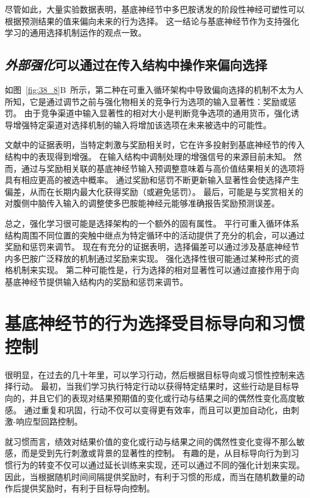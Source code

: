 尽管如此，大量实验数据表明，基底神经节中多巴胺诱发的阶段性神经可塑性可以根据预测结果的值来偏向未来的行为选择。
这一结论与基底神经节作为支持强化学习的通用选择机制运作的观点一致。



\subsection{\textit{外部强化}可以通过在传入结构中操作来偏向选择}

如图~\ref{fig:38_8}B~所示，第二种在可重入循环架构中导致偏向选择的机制不太为人所知，它是通过调节之前与强化物相关的竞争行为选项的输入显著性：奖励或惩罚。
由于竞争渠道中输入显著性的相对大小是判断竞争选项的通用货币，强化诱导增强特定渠道对选择机制的输入将增加该选项在未来被选中的可能性。


文献中的证据表明，当特定刺激与奖励相关时，它在许多投射到基底神经节的传入结构中的表现得到增强。
在输入结构中调制处理的增强信号的来源目前未知。
然而，通过与奖励相关联的基底神经节输入预调整意味着与高价值结果相关的选项将具有相应更高的被选中概率。
通过奖励和惩罚不断更新输入显著性会使选择产生偏差，从而在长期内最大化获得奖励（或避免惩罚）。
最后，可能是与奖赏相关的对腹侧中脑传入输入的调整使多巴胺能神经元能够准确报告奖励预测误差。


总之，强化学习很可能是选择架构的一个额外的固有属性。
平行可重入循环体系结构周围不同位置的突触中继点为特定循环中的活动提供了充分的机会，可以通过奖励和惩罚来调节。
现在有充分的证据表明，选择偏差可以通过涉及基底神经节内多巴胺广泛释放的机制通过奖励来实现。
强化选择性很可能通过某种形式的资格机制来实现。
第二种可能性是，行为选择的相对显著性可以通过直接作用于向基底神经节提供输入结构内的奖励和惩罚来调节。



\section{基底神经节的行为选择受目标导向和习惯控制}

很明显，在过去的几十年里，可以学习行动，然后根据目标导向或习惯性控制来选择行动。
最初，当我们学习执行特定行动以获得特定结果时，这些行动是目标导向的，并且它们的表现对结果预期值的变化或行动与结果之间的偶然性变化高度敏感。
通过重复和巩固，行动不仅可以变得更有效率，而且可以更加自动化，由刺激-响应型回路控制。


就习惯而言，绩效对结果价值的变化或行动与结果之间的偶然性变化变得不那么敏感，而是受到先行刺激或背景的显著性的控制。
有趣的是，从目标导向行为到习惯行为的转变不仅可以通过延长训练来实现，还可以通过不同的强化计划来实现。
因此，当根据随机时间间隔提供奖励时，有利于习惯的形成，而当在随机数量的动作后提供奖励时，有利于目标导向控制。


